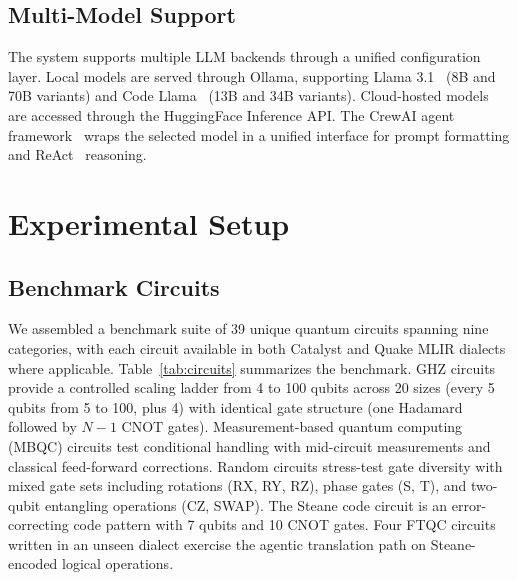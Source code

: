 \documentclass[conference]{IEEEtran}
\begin{document}
\subsection{Multi-Model Support}\label{sec:models}

The system supports multiple LLM backends through a unified configuration layer. Local models are served through Ollama, supporting Llama 3.1~\cite{dubey2024llama3} (8B and 70B variants) and Code Llama~\cite{roziere2023codellama} (13B and 34B variants). Cloud-hosted models are accessed through the HuggingFace Inference API. The CrewAI agent framework~\cite{hong2024crewai} wraps the selected model in a unified interface for prompt formatting and ReAct~\cite{yao2023react} reasoning.

\section{Experimental Setup}\label{sec:experiments}

\subsection{Benchmark Circuits}

We assembled a benchmark suite of 39 unique quantum circuits spanning nine categories, with each circuit available in both Catalyst and Quake MLIR dialects where applicable. Table~\ref{tab:circuits} summarizes the benchmark. GHZ circuits provide a controlled scaling ladder from 4 to 100 qubits across 20 sizes (every 5 qubits from 5 to 100, plus 4) with identical gate structure (one Hadamard followed by $N{-}1$ CNOT gates). Measurement-based quantum computing (MBQC) circuits test conditional handling with mid-circuit measurements and classical feed-forward corrections. Random circuits stress-test gate diversity with mixed gate sets including rotations (RX, RY, RZ), phase gates (S, T), and two-qubit entangling operations (CZ, SWAP). The Steane code circuit is an error-correcting code pattern with 7 qubits and 10 CNOT gates. Four FTQC circuits written in an unseen dialect exercise the agentic translation path on Steane-encoded logical operations.
\end{document}

